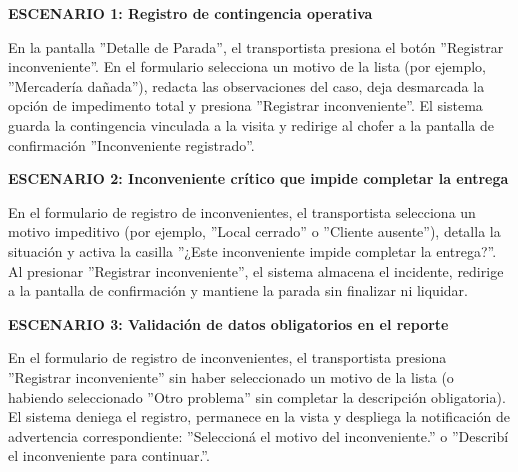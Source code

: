 \documentclass[a4paper,9pt]{article}
\begin{document}
\begin{tcolorbox}[hucard, title={\textbf{HU-56: REGISTRAR INCONVENIENTES CON LA ENTREGA} \hfill \scriptsize \colorbox{bluestatus}{\textbf{\ New\ }} \quad \colorbox{white}{\textcolor{primarydark}{\textbf{\ 1 pt\ }}}}]
{\noindent\textbf{\textcolor{secondarydark}{ESCENARIO 1:  Registro de contingencia operativa}}\par\vspace{1pt}
En la pantalla ''Detalle de Parada'', el transportista presiona el botón ''Registrar inconveniente''. En el formulario selecciona un motivo de la lista (por ejemplo, ''Mercadería dañada''), redacta las observaciones del caso, deja desmarcada la opción de impedimento total y presiona ''Registrar inconveniente''. El sistema guarda la contingencia vinculada a la visita y redirige al chofer a la pantalla de confirmación ''Inconveniente registrado''.\par\vspace{2.5pt}
\noindent\textbf{\textcolor{secondarydark}{ESCENARIO 2:  Inconveniente crítico que impide completar la entrega}}\par\vspace{1pt}
En el formulario de registro de inconvenientes, el transportista selecciona un motivo impeditivo (por ejemplo, ''Local cerrado'' o ''Cliente ausente''), detalla la situación y activa la casilla ''¿Este inconveniente impide completar la entrega?''. Al presionar ''Registrar inconveniente'', el sistema almacena el incidente, redirige a la pantalla de confirmación y mantiene la parada sin finalizar ni liquidar.\par\vspace{2.5pt}
\noindent\textbf{\textcolor{secondarydark}{ESCENARIO 3:  Validación de datos obligatorios en el reporte}}\par\vspace{1pt}
En el formulario de registro de inconvenientes, el transportista presiona ''Registrar inconveniente'' sin haber seleccionado un motivo de la lista (o habiendo seleccionado ''Otro problema'' sin completar la descripción obligatoria). El sistema deniega el registro, permanece en la vista y despliega la notificación de advertencia correspondiente: ''Seleccioná el motivo del inconveniente.'' o ''Describí el inconveniente para continuar.''.\par\vspace{2.5pt}
}\par
\end{tcolorbox}
\end{document}
